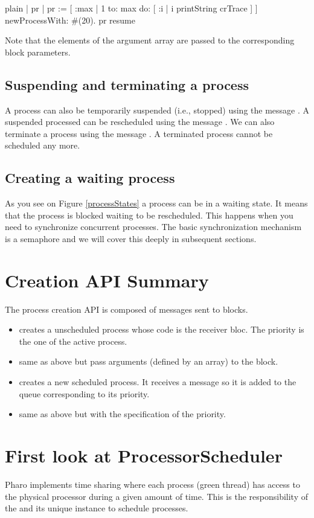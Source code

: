 \documentclass[10pt,twoside,english]{_support/latex/sbabook/sbabook}
\begin{document}
\begin{displaycode}{plain}
| pr |
pr := [ :max |
  1 to: max do: [ :i |
    i  printString crTrace ] ] newProcessWith: #(20).
pr resume
\end{displaycode}

Note that the elements of the argument array are passed to the corresponding block parameters.
\subsection{Suspending and terminating a process}
A process can also be temporarily suspended (i.e., stopped) using the message . 
A suspended processed can be rescheduled using the message . 
We can also terminate a process using the message . 
A terminated process cannot be scheduled any more.
\subsection{Creating a waiting process}
As you see on Figure \ref{processStates} a process can be in a waiting state.
It means that the process is blocked waiting to be rescheduled. 
This happens when you need to synchronize concurrent processes.
The basic synchronization mechanism is a semaphore and we will cover this deeply in subsequent sections.
\section{Creation API Summary}
The process creation API is composed of messages sent to blocks. 

\begin{itemize}
\item {} creates a unscheduled process whose code is the receiver bloc. The priority is the one of the active process. 
\item {}  same as above but pass arguments (defined by an array) to the block.
\item {} creates a new scheduled process. It receives a  message so it is added to the queue corresponding to its priority. 
\item {} same as above but with the specification of the priority. 
\end{itemize}
\section{First look at ProcessorScheduler}
Pharo implements time sharing where each process (green thread) has access to the physical processor during a given amount of time. 
This is the responsibility of the  and its unique instance  to schedule processes. 
\end{document}
